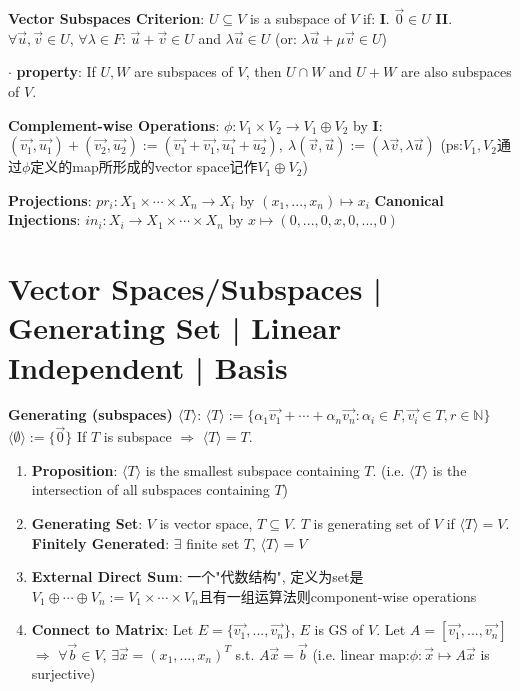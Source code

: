 \documentclass[9pt]{article}
\begin{document}
\textbf{Vector Subspaces Criterion}: {\small $U\subseteq V$ is a subspace of $V$ if: \quad \textbf{I}. $\vec{0}\in U$ \quad \textbf{II}. $\forall \vec{u},\vec{v}\in U$, $\forall \lambda\in F$: $\vec{u}+\vec{v}\in U$ and $\lambda\vec{u}\in U$ \quad (or: $\lambda\vec{u}+\mu\vec{v}\in U$)}

$\cdot$ \textbf{property}: {\small If $U,W$ are subspaces of $V$, then $U\cap W$ and $U + W$ are also subspaces of $V$.} 

\textbf{\small Complement-wise Operations}: {\scriptsize $\phi:V_1\times V_2\to V_1\oplus V_2$ by \textbf{I}:$(\vec{v_1},\vec{u_1})+(\vec{v_2},\vec{u_2}):=(\vec{v_1}+\vec{v_1},\vec{u_1}+\vec{u_2}), \ \lambda(\vec{v},\vec{u}):=(\lambda\vec{v},\lambda\vec{u})$ {\tiny (ps:$V_1,V_2$通过$\phi$定义的map所形成的vector space记作$V_1\oplus V_2$)}}

\textbf{Projections}: $pr_i:X_1\times\cdots\times X_n\to X_i$ by $(x_1,...,x_n)\mapsto x_i$ \quad \textbf{Canonical Injections}: $in_i:X_i\to X_1\times\cdots\times X_n$ by $x\mapsto(0,...,0,x,0,...,0)$


\section{Vector Spaces/Subspaces | Generating Set | Linear Independent | Basis} %

\textbf{Generating (subspaces) $\langle T\rangle$}: $\langle T\rangle:=\{\alpha_1\vec{v_1}+\cdots+\alpha_n\vec{v_n}:\alpha_i\in F,\vec{v_i}\in T,r\in\mathbb{N}\}$ \quad $\langle\emptyset\rangle:=\{\vec{0}\}$ \quad  If $T$ is subspace $\Rightarrow$ $\langle T\rangle=T$.

\begin{enumerate}[itemsep=-2pt, topsep=-2pt]
    \item \textbf{Proposition}: $\langle T\rangle$ is the smallest subspace containing $T$. (i.e. $\langle T \rangle$ is the intersection of all subspaces containing $T$)
    \item \textbf{Generating Set}: $V$ is vector space, $T\subseteq V$. $T$ is generating set of $V$ if $\langle T\rangle=V$. \quad \textbf{Finitely Generated}: $\exists$ finite set $T$, $\langle T\rangle=V$
    \item \textbf{External Direct Sum}: {\small 一个"代数结构", 定义为set是$V_1\oplus\cdots\oplus V_n:=V_1\times\cdots\times V_n$且有一组运算法则component-wise operations}
    \item \textbf{Connect to Matrix}: {\footnotesize Let $E=\{\vec{v_1},...,\vec{v_n}\}$, $E$ is GS of $V$. Let $A=[\vec{v_1},...,\vec{v_n}]$ $\Rightarrow$ $\forall\vec{b}\in V$, $\exists \vec{x}=(x_1,...,x_n)^T$ s.t. $A\vec{x}=\vec{b}$ (i.e. linear map:$\phi:\vec{x}\mapsto A\vec{x}$ is surjective)}
\end{enumerate}
\end{document}
